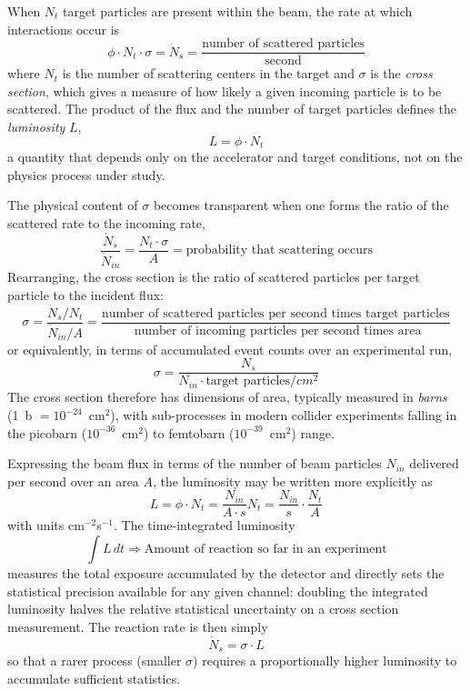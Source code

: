 When $N_t$ target particles are present within the beam, the rate at which
interactions occur is
\begin{equation}
    \phi \cdot N_t \cdot \sigma = \dot{N}_{s} = \frac{\text{number of scattered particles}}{\text{second}}
\end{equation}
where $N_t$ is the number of scattering centers in the target and $\sigma$ is the
\emph{cross section}, which gives a measure of how likely a given incoming
particle is to be scattered. The product of the flux and the number of target
particles defines the \emph{luminosity} $L$,
\begin{equation*}
    L = \phi \cdot N_t
\end{equation*}
a quantity that depends only on the accelerator and target conditions, not on the
physics process under study.
 
The physical content of $\sigma$ becomes transparent when one forms the ratio of
the scattered rate to the incoming rate,
\begin{equation}
    \frac{\dot{N}_s}{\dot{N}_{in}} = \frac{N_t \cdot \sigma}{A} = \text{probability that scattering occurs}
\end{equation}
Rearranging, the cross section is the ratio of scattered particles per target particle
to the incident flux:
\begin{equation}
    \sigma = \frac{\dot{N}_s/N_t}{\dot{N}_{in}/A} = \frac{\text{number of scattered particles per second times target particles}}{\text{ number of incoming particles per second times area}}
\end{equation}
or equivalently, in terms of accumulated event counts over an experimental run,
\begin{equation}
    \sigma = \frac{N_s}{N_{in} \cdot \text{target particles}/cm^2}
\end{equation}
The cross section therefore has dimensions of area, typically measured in
\emph{barns} (1~b $= 10^{-24}$~cm$^2$), with sub-processes in modern
collider experiments falling in the picobarn ($10^{-36}$~cm$^2$) to femtobarn
($10^{-39}$~cm$^2$) range.
 
Expressing the beam flux in terms of the number of beam particles $N_{in}$
delivered per second over an area $A$, the luminosity may be written more
explicitly as
\begin{equation}
    L = \phi \cdot N_t = \frac{N_{in}}{A \cdot s} N_t = \frac{N_{in}}{s} \cdot \frac{N_t}{A}
\end{equation}
with units cm$^{-2}$s$^{-1}$. The time-integrated luminosity
\begin{equation}
    \int L \, dt \Rightarrow \text{Amount of reaction so far in an experiment}
\end{equation}
measures the total exposure accumulated by the detector and directly sets the
statistical precision available for any given channel: doubling the integrated
luminosity halves the relative statistical uncertainty on a cross section measurement.
The reaction rate is then simply
\begin{equation}
    \dot{N}_s = \sigma \cdot L
\end{equation}
so that a rarer process (smaller $\sigma$) requires a proportionally higher
luminosity to accumulate sufficient statistics.
 
